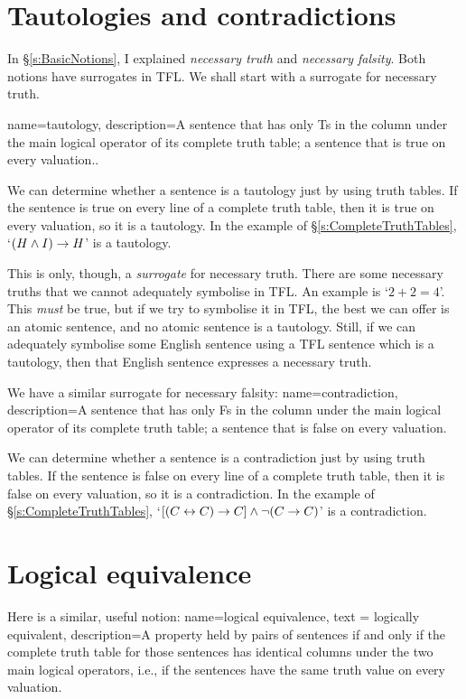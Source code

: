 \section{Tautologies and contradictions}
In \S\ref{s:BasicNotions}, I explained \emph{necessary truth} and \emph{necessary falsity}. Both notions have surrogates in TFL. We shall start with a surrogate for necessary truth.

{
name=tautology,
description={A sentence that has only Ts in the column under the main logical operator of its complete truth table; a sentence that is true on every valuation..}
}

We can determine whether a sentence is a tautology just by using truth tables. If the sentence is true on every line of a complete truth table, then it is true on every valuation, so it is a tautology. In the example of \S\ref{s:CompleteTruthTables}, `$(H \wedge I) \rightarrow H$' is a tautology. 

This is only, though, a \emph{surrogate} for necessary truth. There are some necessary truths that we cannot adequately symbolise in TFL. An example is `$2 + 2 = 4$'. This \emph{must} be true, but if we try to symbolise it in TFL, the best we can offer is an atomic sentence, and no atomic sentence is a tautology. Still, if we can adequately symbolise some English sentence using a TFL sentence which is a tautology, then that English sentence expresses a necessary truth.

We have a similar surrogate for necessary falsity:
{
name=contradiction,
description={A sentence that has only Fs in the column under the main logical operator of its complete truth table; a sentence that is false on every valuation.}
}

We can determine whether a sentence is a contradiction just by using truth tables. If the sentence is false on every line of a complete truth table, then it is false on every valuation, so it is a contradiction. In the example of \S\ref{s:CompleteTruthTables}, `$[(C\leftrightarrow C) \rightarrow C] \wedge \neg(C \rightarrow C)$' is a contradiction.


\section{Logical equivalence}
Here is a similar, useful notion:
{
  name=logical equivalence,
  text = logically equivalent,
description={A property held by pairs of sentences if and only if the complete truth table for those sentences has identical columns under the two main logical operators, i.e., if the sentences have the same truth value on every valuation.}
}


